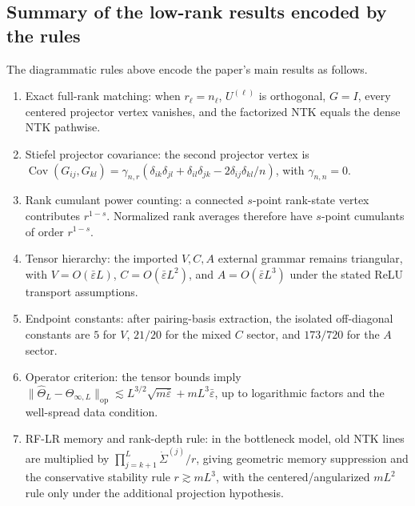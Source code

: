 \documentclass{article}
\newcommand{\Cov}{\operatorname{Cov}}
\newcommand{\op}{\mathrm{op}}
\newcommand{\barE}{\bar\varepsilon}
\begin{document}
\subsection{Summary of the low-rank results encoded by the rules}
\label{app:diagrammatic-results-summary}
The diagrammatic rules above encode the paper's main results as follows.
\begin{enumerate}[leftmargin=1.5em]
\item Exact full-rank matching: when \(r_\ell=n_\ell\), \(U^{(\ell)}\) is orthogonal, \(G=I\), every centered projector vertex vanishes, and the factorized NTK equals the dense NTK pathwise.
\item Stiefel projector covariance: the second projector vertex is \(\Cov(G_{ij},G_{kl})=\gamma_{n,r}(\delta_{ik}\delta_{jl}+\delta_{il}\delta_{jk}-2\delta_{ij}\delta_{kl}/n)\), with \(\gamma_{n,n}=0\).
\item Rank cumulant power counting: a connected \(s\)-point rank-state vertex contributes \(r^{1-s}\). Normalized rank averages therefore have \(s\)-point cumulants of order \(r^{1-s}\).
\item Tensor hierarchy: the imported \(V,C,A\) external grammar remains triangular, with \(V=O(\barE L)\), \(C=O(\barE L^2)\), and \(A=O(\barE L^3)\) under the stated ReLU transport assumptions.
\item Endpoint constants: after pairing-basis extraction, the isolated off-diagonal constants are \(5\) for \(V\), \(21/20\) for the mixed \(C\) sector, and \(173/720\) for the \(A\) sector.
\item Operator criterion: the tensor bounds imply \(\|\widehat\Theta_L-\Theta_{\infty,L}\|_{\op}\lesssim L^{3/2}\sqrt{m\barE}+mL^3\barE\), up to logarithmic factors and the well-spread data condition.
\item RF-LR memory and rank-depth rule: in the bottleneck model, old NTK lines are multiplied by \(\prod_{j=k+1}^L \dot\Sigma^{(j)}/r\), giving geometric memory suppression and the conservative stability rule \(r\gtrsim mL^3\), with the centered/angularized \(mL^2\) rule only under the additional projection hypothesis.
\end{enumerate}

\vspace{-0.8em}
\end{document}
